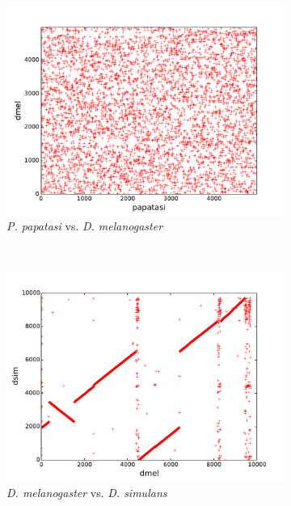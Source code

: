 \begin{figure}[H]
\begin{subfigure}[b]{0.45\textwidth}
  \end{subfigure}
  ~
  \begin{subfigure}[b]{0.45\textwidth}
    \includegraphics[width=\textwidth]{figures/synteny/papatasi_dmel_plot}
    \caption{\emph{P. papatasi} vs. \emph{D. melanogaster}}
    \label{fig:synteny-dotplots-papatasi-dmel}
  \end{subfigure}
  ~
  \begin{subfigure}[b]{0.45\textwidth}
    \includegraphics[width=\textwidth]{figures/synteny/dmel_dsim_plot}
    \caption{\emph{D. melanogaster} vs. \emph{D. simulans}}
    \label{fig:synteny-dotplots-drosophila}
  \end{subfigure}
  ~
  \begin{subfigure}[b]{0.45\textwidth}

\end{subfigure}
\end{figure}
